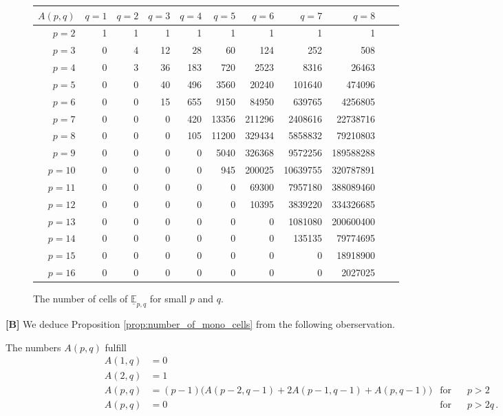 \begin{figure}[ht]
\centering
\begin{tabular}{|r||r|r|r|r|r|r|r|r|r|r|}
    \hline
    $A(p,q)$ & $q=1$ & $q=2$ & $q=3$ & $q=4$ & $q=5$ & $q=6$ & $q=7$ & $q=8$ \\
    \hline
    \hline
    $p=2$ & 1 & 1 & 1 & 1 & 1 & 1 & 1 & 1 \\
    \hline
    $p=3$ & 0 & 4 & 12 & 28 & 60 & 124 & 252 & 508 \\
    \hline
    $p=4$ & 0 & 3 & 36 & 183 & 720 & 2523 & 8316 & 26463 \\
    \hline
    $p=5$ & 0 & 0 & 40 & 496 & 3560 & 20240 & 101640 & 474096 \\
    \hline
    $p=6$ & 0 & 0 & 15 & 655 & 9150 & 84950 & 639765 & 4256805 \\
    \hline
    $p=7$ & 0 & 0 & 0 & 420 & 13356 & 211296 & 2408616 & 22738716 \\
    \hline
    $p=8$ & 0 & 0 & 0 & 105 & 11200 & 329434 & 5858832 & 79210803 \\
    \hline
    $p=9$ & 0 & 0 & 0 & 0 & 5040 & 326368 & 9572256 & 189588288 \\
    \hline
    $p=10$ & 0 & 0 & 0 & 0 & 945 & 200025 & 10639755 & 320787891 \\
    \hline
    $p=11$ & 0 & 0 & 0 & 0 & 0 & 69300 & 7957180 & 388089460 \\
    \hline
    $p=12$ & 0 & 0 & 0 & 0 & 0 & 10395 & 3839220 & 334326685 \\
    \hline
    $p=13$ & 0 & 0 & 0 & 0 & 0 & 0 & 1081080 & 200600400 \\
    \hline
    $p=14$ & 0 & 0 & 0 & 0 & 0 & 0 & 135135 & 79774695 \\
    \hline
    $p=15$ & 0 & 0 & 0 & 0 & 0 & 0 & 0 & 18918900 \\
    \hline
    $p=16$ & 0 & 0 & 0 & 0 & 0 & 0 & 0 & 2027025 \\
    \hline
\end{tabular}
\caption{\label{complexity:table_number_of_cells_for_all_m}The number of cells of $\underline{\mathbb E}_{p,q}$ for small $p$ and $q$.}
\end{figure}

{\bf [B]} We deduce Proposition \ref{prop:number_of_mono_cells} from the following oberservation.

\begin{lem}
    \label{lem:Apq_recursion}
    The numbers $A(p,q)$ fulfill
    \begin{align}
        \label{CharA1q}         A(1,q) &= 0 \\
        \label{CharA2q}         A(2,q) &= 1 \\
        \label{CharApq}         A(p,q) &= (p-1) \big( A(p-2,q-1) + 2A(p-1,q-1) + A(p,q-1) \big) & \text{for} & \hspace{10pt} p > 2 \\
        \label{CharAp_ge_2q}    A(p,q) &= 0                                                     & \text{for} & \hspace{10pt} p > 2q \,.
    \end{align}
\end{lem}

